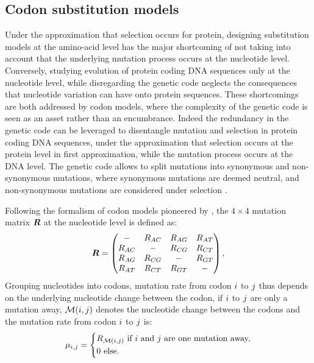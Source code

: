 \subsection{Codon \gls{substitution} models}
Under the approximation that selection occurs for protein, designing \gls{substitution} models at the amino-acid level has the major shortcoming of not taking into account that the underlying mutation process occurs at the nucleotide level.
Conversely, studying evolution of protein coding \acrshort{DNA} sequences only at the nucleotide level, while disregarding the genetic code neglects the consequences that nucleotide variation can have onto protein sequences.
These shortcomings are both addressed by \gls{codon} models, where the complexity of the genetic code is seen as an asset rather than an encumbrance.
Indeed the redundancy in the genetic code can be leveraged to disentangle mutation and selection in protein coding \acrshort{DNA} sequences, under the approximation that selection occurs at the protein level in first approximation, while the mutation process occurs at the \acrshort{DNA} level.
The genetic code allows to split mutations into synonymous and non-synonymous mutations, where synonymous mutations are deemed \gls{neutral}, and non-synonymous mutations are considered under selection \citep{Muse1994,Goldman1994}.

Following the formalism of \gls{codon} models pioneered by \citet{Muse1994}, the $4 \times 4$ mutation matrix $\bm{R}$ at the nucleotide level is defined as:
\begin{equation}
\label{eq:mutrates}
\bm{R} = \begin{pmatrix}
- & {R_{AC}} & 		{R_{AG}} & 		{R_{AT}} \\
{R_{AC}} & - & {R_{CG}} &		{R_{CT}} \\
{R_{AG}} & 		{R_{CG}} & - & {R_{GT}} \\
{R_{AT}} & 		{R_{CT}} & 		{R_{GT}} & -
\end{pmatrix},
\end{equation}
Grouping nucleotides into \glspl{codon}, mutation rate from \gls{codon} ${i}$ to ${j}$ thus depends on the underlying nucleotide change between the \gls{codon}, if ${i}$ to ${j}$ are only a mutation away, $\mathcal{M}({i}, {j})$ denotes the nucleotide change between the \glspl{codon} and the mutation rate from \gls{codon} ${i}$ to ${j}$ is:
\begin{equation}
\mu_{{i}, {j}} = 
\begin{dcases}
 R_{\mathcal{M}({i}, {j})} \text{ if ${i}$ and ${j}$ are one mutation away,} \\
 0 \text{ else.}
\end{dcases}
\end{equation}

